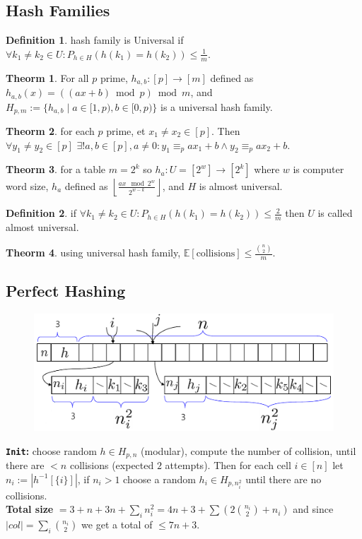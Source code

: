 \documentclass[]{article}
\newcommand\compactsubsection[1]        {\vspace{-10pt}\subsection{#1}\vspace{-5pt}}
\theoremstyle{definition}
\newtheorem{Theorem}{\color{theoColor}Theorm}
\newtheorem{Definition}{\color{defiColor}Definition}
\newcommand\theo  [1] {\begin{Theorem}#1\end{Theorem}}
\newcommand\defi  [1] {\begin{Definition}#1\end{Definition}}
\newcommand\E     {\mathbb{E}}
\newcommand\set   {\ell et \text{ }}
\newcommand\rf    {\right\rfloor}
\newcommand\lf    {\left\lfloor}
\newcommand\floor [1] {\lf #1 \rf}
\newcommand\co        {\colon}
\newcommand\op    {^{-1}}
\newcommand\sof[1]    {\left | #1 \right |}
\begin{document}
\begin{multicols}{4}
			\compactsubsection{Hash Families}
				\defi{hash family is \color{defiColor}Universal\color{black} if $\forall k_1 \neq k_2 \in U \co P_{h \in H}(h(k_1) = h(k_2)) \le \frac{1}{m}$. }
				\theo{For all $p$ prime, $h_{a, b} \co [p] \to [m]$ defined as $h_{a, b}(x) = ((ax + b) \bmod p)\bmod m$, and $H_{p, m} := \{h_{a, b} \mid a \in [1, p), b \in [0, p)\}$ is a universal hash family. }
				\theo{for each $p$ prime, \set $x_1 \neq x_2 \in [p]$. Then $\forall y_1 \neq y_2 \in [p]\,\, \exists ! a, b \in [p], a \neq 0 \co y_1 \equiv_p ax_1 + b \land y_2 \equiv_p ax_2 + b$. }
				\theo{for a table $m = 2^{k}$ so $h_a \co U = [2^{w}] \to [2^{k}]$ where $w$ is computer word size, $h_a$ defined as $\floor{\frac{ax \mod 2^{w}}{2^{w - k}}}$, and $H$ is almost universal. }
				\defi{if $\forall k_1 \neq k_2 \in U \co P_{h \in H}(h(k_1) = h(k_2)) \le \frac{2}{m}$ then $U$ is called \color{defiColor}almost universal\color{black}. }
				\theo{using universal hash family, $\E[\text{collisions}] \le \frac{\binom{n}{2}}{m}$. }
		
		
			\compactsubsection{Perfect Hashing}
				\begin{figure}
					\includegraphics[width=\linewidth]{images/perfectHash}
				\end{figure}
				\textbf{\texttt{Init}: }choose random $h \in H_{p, n}$ (modular), compute the number of collision, until there are $< n$ collisions (expected $2$ attempts). Then for each cell $i \in [n]$ let $n_i := \sof{h\op[\{i\}]}$, if $n_i > 1$ choose a random $h_i \in H_{p, n_i^2}$ until there are no collisions. \\
				\textbf{Total size }$=3 + n + 3n + \sum_i n_i^2 = 4n + 3 + \sum(2\binom{n_i}{2} + n_i)$ and since $|col| = \sum_i \binom{n_i}{2}$ we get a total of $\le 7n + 3$. 
				

\end{multicols}
\end{document}

